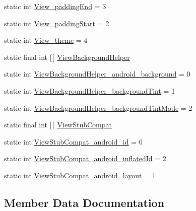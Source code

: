 \begin{DoxyCompactItemize}
\item 
static int \hyperlink{classandroid_1_1support_1_1v4_1_1R_1_1styleable_aaf0551565567bdd67dbb44b8d96469f7}{View\+\_\+padding\+End} = 3
\item 
static int \hyperlink{classandroid_1_1support_1_1v4_1_1R_1_1styleable_a8672f9bf1c5d1bbaf3c499fd347a58a7}{View\+\_\+padding\+Start} = 2
\item 
static int \hyperlink{classandroid_1_1support_1_1v4_1_1R_1_1styleable_ad8eb1747750c305519d79611a84ea08b}{View\+\_\+theme} = 4
\item 
static final int \mbox{[}$\,$\mbox{]} \hyperlink{classandroid_1_1support_1_1v4_1_1R_1_1styleable_aef8d9a5ffe04de4b6d0f50e89e307ca4}{View\+Background\+Helper}
\item 
static int \hyperlink{classandroid_1_1support_1_1v4_1_1R_1_1styleable_a6ad01bddeaa9cf74d6c553c92ea9c93a}{View\+Background\+Helper\+\_\+android\+\_\+background} = 0
\item 
static int \hyperlink{classandroid_1_1support_1_1v4_1_1R_1_1styleable_a27d86c38662cdce2ce4f892520e28b4c}{View\+Background\+Helper\+\_\+background\+Tint} = 1
\item 
static int \hyperlink{classandroid_1_1support_1_1v4_1_1R_1_1styleable_a3f0822323295c7efedb70efaaefe60dc}{View\+Background\+Helper\+\_\+background\+Tint\+Mode} = 2
\item 
static final int \mbox{[}$\,$\mbox{]} \hyperlink{classandroid_1_1support_1_1v4_1_1R_1_1styleable_a1cd2d3a360da85e50068df345a364a59}{View\+Stub\+Compat}
\item 
static int \hyperlink{classandroid_1_1support_1_1v4_1_1R_1_1styleable_ada9d7e1b152db1b18492689abaa58a30}{View\+Stub\+Compat\+\_\+android\+\_\+id} = 0
\item 
static int \hyperlink{classandroid_1_1support_1_1v4_1_1R_1_1styleable_a99ce544fb3cb0bda464169d5f26b9806}{View\+Stub\+Compat\+\_\+android\+\_\+inflated\+Id} = 2
\item 
static int \hyperlink{classandroid_1_1support_1_1v4_1_1R_1_1styleable_af1b362398fc2f79e6599ea6bf0d712cc}{View\+Stub\+Compat\+\_\+android\+\_\+layout} = 1
\end{DoxyCompactItemize}


\subsection{Member Data Documentation}
\mbox{\label{classandroid_1_1support_1_1v4_1_1R_1_1styleable_adc5a3492b9c46265760d7120a04d6afa}} 
